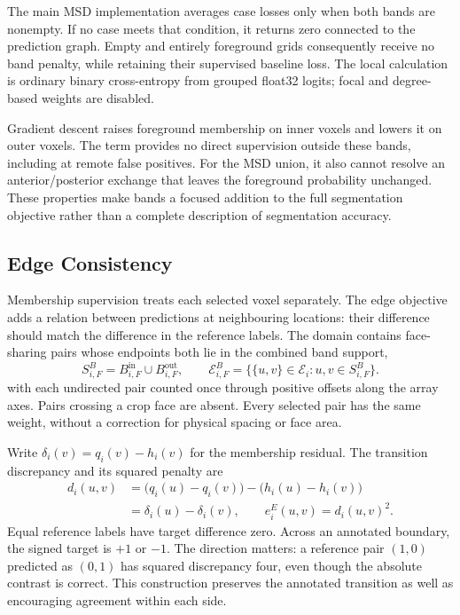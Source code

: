 \documentclass[12pt,a4paper]{article}
\begin{document}
The main MSD implementation averages case losses only when both bands
are nonempty. If no case meets that condition, it returns zero connected
to the prediction graph. Empty and entirely foreground grids consequently
receive no band penalty, while retaining their supervised baseline loss.
The local calculation is ordinary binary cross-entropy from grouped
float32 logits; focal and degree-based weights are disabled.

Gradient descent raises foreground membership on inner voxels and lowers
it on outer voxels. The term provides no direct supervision outside
these bands, including at remote false positives. For the MSD union,
it also cannot resolve an anterior/posterior exchange that leaves the
foreground probability unchanged. These properties make bands a focused
addition to the full segmentation objective rather than a complete
description of segmentation accuracy.

\subsection{Edge Consistency}\label{sec:edge-constraints}

Membership supervision treats each selected voxel separately. The edge
objective adds a relation between predictions at neighbouring locations:
their difference should match the difference in the reference labels.
The domain contains face-sharing pairs whose endpoints both lie in the
combined band support,
\begin{equation}
S_{i,F}^{B}=B_{i,F}^{\mathrm{in}}\cup B_{i,F}^{\mathrm{out}},
\qquad
\mathcal{E}_{i,F}^{B}
=\bigl\{\{u,v\}\in\mathcal{E}_i:
          u,v\in S_{i,F}^{B}\bigr\}.
\label{eq:edge-supported-pairs}
\end{equation}
with each undirected pair counted once through positive offsets along
the array axes. Pairs crossing a crop face are absent. Every selected
pair has the same weight, without a correction for physical spacing or
face area.

Write $\delta_i(v)=q_i(v)-h_i(v)$ for the membership residual. The
transition discrepancy and its squared penalty are
\begin{equation}
\begin{aligned}
d_i(u,v)
 &=\bigl(q_i(u)-q_i(v)\bigr)
   -\bigl(h_i(u)-h_i(v)\bigr)\\
 &=\delta_i(u)-\delta_i(v),
\qquad e_i^{E}(u,v)=d_i(u,v)^2.
\end{aligned}
\label{eq:edge-transition-discrepancy}
\end{equation}
Equal reference labels have target difference zero. Across an annotated
boundary, the signed target is $+1$ or $-1$. The direction matters: a
reference pair $(1,0)$ predicted as $(0,1)$ has squared discrepancy four,
even though the absolute contrast is correct. This construction preserves
the annotated transition as well as encouraging agreement within each
side.
\end{document}

